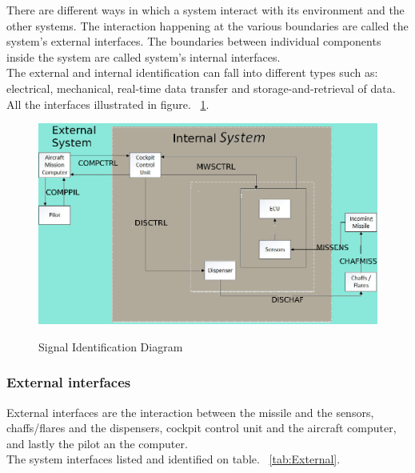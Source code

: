 There are different ways in which a system interact with its environment and the other systems. The interaction happening at the various boundaries are called the system's external interfaces. The boundaries between individual components inside the system are called system's internal interfaces.\\
The external and internal identification can fall into different types such as: electrical, mechanical, real-time data transfer and storage-and-retrieval of data. All the interfaces illustrated in figure. ~\ref{fig:sigFlowDiagram}.
  \begin{figure}[h]
  	\centering
 	\includegraphics[scale=0.5]{./images/SignalFlowDiagramDDD_v2}\\
  	\caption{Signal Identification Diagram}
      \label{fig:sigFlowDiagram}
  \end{figure}

\subsubsection{External interfaces}
 External interfaces are the interaction between the missile and the sensors, chaffs/flares and the dispensers, cockpit control unit and the aircraft computer, and lastly the pilot an the computer.\\
 The system interfaces listed and identified on table. ~\ref{tab:External}.



